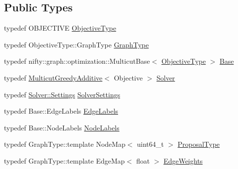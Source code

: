 \subsection*{Public Types}
\begin{DoxyCompactItemize}
\item 
typedef O\+B\+J\+E\+C\+T\+I\+V\+E \hyperlink{classnifty_1_1graph_1_1optimization_1_1common_1_1GreedyAdditiveMulticutProposals_a82ebea313ce98149a4ac7003b792d6fe}{Objective\+Type}
\item 
typedef Objective\+Type\+::\+Graph\+Type \hyperlink{classnifty_1_1graph_1_1optimization_1_1common_1_1GreedyAdditiveMulticutProposals_a7e395c2bc3f18b9df2167e99f43e73f5}{Graph\+Type}
\item 
typedef nifty\+::graph\+::optimization\+::\+Multicut\+Base$<$ \hyperlink{classnifty_1_1graph_1_1optimization_1_1common_1_1GreedyAdditiveMulticutProposals_a82ebea313ce98149a4ac7003b792d6fe}{Objective\+Type} $>$ \hyperlink{classnifty_1_1graph_1_1optimization_1_1common_1_1GreedyAdditiveMulticutProposals_a903eacc5a19cb47916995019e4db2e0e}{Base}
\item 
typedef \hyperlink{classnifty_1_1graph_1_1MulticutGreedyAdditive}{Multicut\+Greedy\+Additive}$<$ Objective $>$ \hyperlink{classnifty_1_1graph_1_1optimization_1_1common_1_1GreedyAdditiveMulticutProposals_a87b47b0b53217d644e7a171b1dd3bfdf}{Solver}
\item 
typedef \hyperlink{classnifty_1_1graph_1_1MulticutGreedyAdditive_ab14192647e24d574c75538087acfd090}{Solver\+::\+Settings} \hyperlink{classnifty_1_1graph_1_1optimization_1_1common_1_1GreedyAdditiveMulticutProposals_a057b884af04f15e3b05190056262b6e9}{Solver\+Settings}
\item 
typedef Base\+::\+Edge\+Labels \hyperlink{classnifty_1_1graph_1_1optimization_1_1common_1_1GreedyAdditiveMulticutProposals_aaee332dfc9ee0e30897cbc1e37a6cff0}{Edge\+Labels}
\item 
typedef Base\+::\+Node\+Labels \hyperlink{classnifty_1_1graph_1_1optimization_1_1common_1_1GreedyAdditiveMulticutProposals_af59b25bf72b3164494b942fbf514f9c8}{Node\+Labels}
\item 
typedef Graph\+Type\+::template Node\+Map$<$ uint64\+\_\+t $>$ \hyperlink{classnifty_1_1graph_1_1optimization_1_1common_1_1GreedyAdditiveMulticutProposals_a2344bbd2084e7c62a179e6f0ce2d11f8}{Proposal\+Type}
\item 
typedef Graph\+Type\+::template Edge\+Map$<$ float $>$ \hyperlink{classnifty_1_1graph_1_1optimization_1_1common_1_1GreedyAdditiveMulticutProposals_a6709922efafd758e0f52169ff073d250}{Edge\+Weights}
\end{DoxyCompactItemize}
